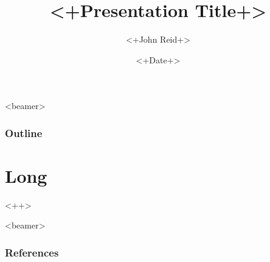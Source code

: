 \documentclass{beamer}
\title{<+Presentation Title+>}
\author{<+John Reid+>}
\date{<+Date+>}
\begin{document}
\maketitle

\begin{frame}<beamer>
  \frametitle{Outline}
  \tableofcontents
\end{frame}

\section[Short]{Long}


<++>

\begin{frame}<beamer>
  \frametitle{References}

  \printbibliography
\end{frame}
\end{document}
